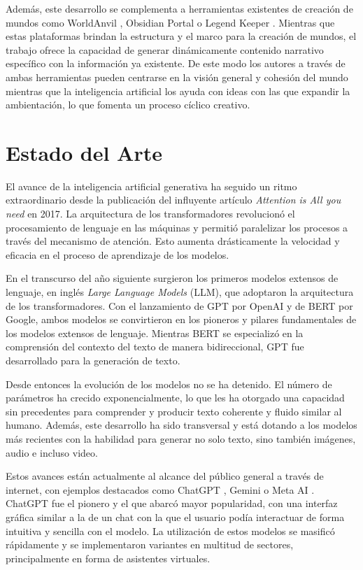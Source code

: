Además, este desarrollo se complementa a herramientas existentes de creación de mundos
como WorldAnvil \cite{worldanvil}, Obsidian Portal \cite{legendkeeper}
o Legend Keeper \cite{obsidianportal}.
Mientras que estas plataformas brindan la estructura y el marco para la creación de mundos,
el trabajo ofrece la capacidad de generar dinámicamente contenido narrativo específico con la información ya existente.
De este modo los autores a través de ambas herramientas pueden centrarse en la visión general y cohesión del mundo mientras que la inteligencia artificial 
los ayuda con ideas con las que expandir la ambientación, lo que fomenta un proceso cíclico creativo.


\section{Estado del Arte}
El avance de la inteligencia artificial generativa ha seguido un ritmo extraordinario desde
la publicación del influyente artículo \textit{Attention is All you need} \cite{att_is_all_you_need}
en 2017.
La arquitectura de los transformadores revolucionó el procesamiento de lenguaje en las máquinas y
permitió paralelizar los procesos a través del mecanismo de atención.
Esto aumenta drásticamente la velocidad y eficacia en el proceso de aprendizaje de los modelos.

En el transcurso del año siguiente surgieron los primeros modelos extensos de lenguaje,
en inglés \textit{Large Language Models} (LLM),
que adoptaron la arquitectura de los transformadores.
Con el lanzamiento de GPT \cite{Radford2018GPT1} por OpenAI y de BERT \cite{Devlin2019BERT} por Google, ambos modelos se convirtieron
en los pioneros y pilares fundamentales de los modelos extensos de lenguaje.
Mientras BERT se especializó en la comprensión del contexto del texto de manera bidireccional, GPT
fue desarrollado para la generación de texto.

Desde entonces la evolución de los modelos no se ha detenido. El número de parámetros
ha crecido exponencialmente, lo que les ha otorgado una capacidad sin precedentes para comprender y
producir texto coherente y fluido similar al humano.
Además, este desarrollo ha sido transversal y está dotando a los modelos más recientes 
con la habilidad para generar no solo texto, sino también imágenes, audio e incluso video.

Estos avances están actualmente al alcance del público general a través de internet, con ejemplos destacados
como ChatGPT \cite{OpenAIChatGPT2022}, Gemini \cite{GeminiTeam2023Gemini} o Meta AI \cite{MetaAIAbout}.
ChatGPT fue el pionero y el que abarcó mayor popularidad,
con una interfaz gráfica similar a la de un chat con la que el usuario podía interactuar de forma intuitiva
y sencilla con el modelo. La utilización de estos modelos se masificó rápidamente y se implementaron variantes
en multitud de sectores, principalmente en forma de asistentes virtuales.

